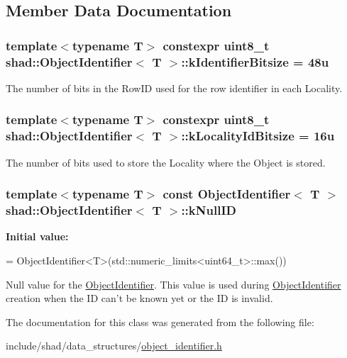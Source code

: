 \subsection{Member Data Documentation}
\hypertarget{classshad_1_1ObjectIdentifier_a39847f9a702ec3f943657650e05b0e02}{
\subsubsection[{k\-Identifier\-Bitsize}]{\setlength{\rightskip}{0pt plus 5cm}template$<$typename T$>$ constexpr uint8\-\_\-t {\bf shad\-::\-Object\-Identifier}$<$ T $>$\-::k\-Identifier\-Bitsize = 48u\hspace{0.3cm}{\ttfamily [static]}}}\label{classshad_1_1ObjectIdentifier_a39847f9a702ec3f943657650e05b0e02}
The number of bits in the Row\-I\-D used for the row identifier in each Locality. \hypertarget{classshad_1_1ObjectIdentifier_abfcf5dac66fd514eea93f86c8c404de9}{
\subsubsection[{k\-Locality\-Id\-Bitsize}]{\setlength{\rightskip}{0pt plus 5cm}template$<$typename T$>$ constexpr uint8\-\_\-t {\bf shad\-::\-Object\-Identifier}$<$ T $>$\-::k\-Locality\-Id\-Bitsize = 16u\hspace{0.3cm}{\ttfamily [static]}}}\label{classshad_1_1ObjectIdentifier_abfcf5dac66fd514eea93f86c8c404de9}


The number of bits used to store the Locality where the Object is stored. 

\hypertarget{classshad_1_1ObjectIdentifier_ad093d487f38c499b7de2de100adbce23}{
\subsubsection[{k\-Null\-I\-D}]{\setlength{\rightskip}{0pt plus 5cm}template$<$typename T$>$ const {\bf Object\-Identifier}$<$ T $>$ {\bf shad\-::\-Object\-Identifier}$<$ T $>$\-::k\-Null\-I\-D\hspace{0.3cm}{\ttfamily [static]}}}\label{classshad_1_1ObjectIdentifier_ad093d487f38c499b7de2de100adbce23}
{\bfseries Initial value\-:}
\begin{DoxyCode}
=
    ObjectIdentifier<T>(std::numeric\_limits<uint64\_t>::max())
\end{DoxyCode}
Null value for the \hyperlink{classshad_1_1ObjectIdentifier}{Object\-Identifier}. This value is used during \hyperlink{classshad_1_1ObjectIdentifier}{Object\-Identifier} creation when the I\-D can't be known yet or the I\-D is invalid. 

The documentation for this class was generated from the following file\-:\begin{DoxyCompactItemize}
\item 
include/shad/data\-\_\-structures/\hyperlink{object__identifier_8h}{object\-\_\-identifier.\-h}\end{DoxyCompactItemize}
